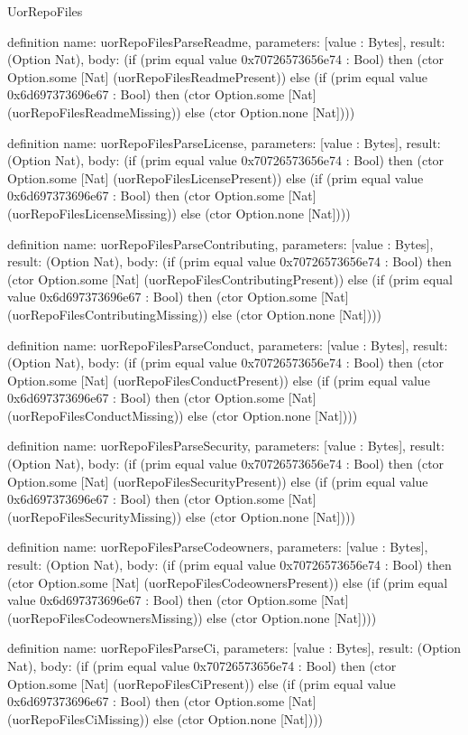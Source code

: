 \begin{lexlean}{UorRepoFiles}
\begin{semanticmodule}
definition{
  name: uorRepoFilesParseReadme,
  parameters: [value : Bytes],
  result: (Option Nat),
  body: (if (prim equal value 0x70726573656e74 : Bool) then (ctor Option.some [Nat] (uorRepoFilesReadmePresent)) else (if (prim equal value 0x6d697373696e67 : Bool) then (ctor Option.some [Nat] (uorRepoFilesReadmeMissing)) else (ctor Option.none [Nat])))
}

definition{
  name: uorRepoFilesParseLicense,
  parameters: [value : Bytes],
  result: (Option Nat),
  body: (if (prim equal value 0x70726573656e74 : Bool) then (ctor Option.some [Nat] (uorRepoFilesLicensePresent)) else (if (prim equal value 0x6d697373696e67 : Bool) then (ctor Option.some [Nat] (uorRepoFilesLicenseMissing)) else (ctor Option.none [Nat])))
}

definition{
  name: uorRepoFilesParseContributing,
  parameters: [value : Bytes],
  result: (Option Nat),
  body: (if (prim equal value 0x70726573656e74 : Bool) then (ctor Option.some [Nat] (uorRepoFilesContributingPresent)) else (if (prim equal value 0x6d697373696e67 : Bool) then (ctor Option.some [Nat] (uorRepoFilesContributingMissing)) else (ctor Option.none [Nat])))
}

definition{
  name: uorRepoFilesParseConduct,
  parameters: [value : Bytes],
  result: (Option Nat),
  body: (if (prim equal value 0x70726573656e74 : Bool) then (ctor Option.some [Nat] (uorRepoFilesConductPresent)) else (if (prim equal value 0x6d697373696e67 : Bool) then (ctor Option.some [Nat] (uorRepoFilesConductMissing)) else (ctor Option.none [Nat])))
}

definition{
  name: uorRepoFilesParseSecurity,
  parameters: [value : Bytes],
  result: (Option Nat),
  body: (if (prim equal value 0x70726573656e74 : Bool) then (ctor Option.some [Nat] (uorRepoFilesSecurityPresent)) else (if (prim equal value 0x6d697373696e67 : Bool) then (ctor Option.some [Nat] (uorRepoFilesSecurityMissing)) else (ctor Option.none [Nat])))
}

definition{
  name: uorRepoFilesParseCodeowners,
  parameters: [value : Bytes],
  result: (Option Nat),
  body: (if (prim equal value 0x70726573656e74 : Bool) then (ctor Option.some [Nat] (uorRepoFilesCodeownersPresent)) else (if (prim equal value 0x6d697373696e67 : Bool) then (ctor Option.some [Nat] (uorRepoFilesCodeownersMissing)) else (ctor Option.none [Nat])))
}

definition{
  name: uorRepoFilesParseCi,
  parameters: [value : Bytes],
  result: (Option Nat),
  body: (if (prim equal value 0x70726573656e74 : Bool) then (ctor Option.some [Nat] (uorRepoFilesCiPresent)) else (if (prim equal value 0x6d697373696e67 : Bool) then (ctor Option.some [Nat] (uorRepoFilesCiMissing)) else (ctor Option.none [Nat])))
}


\end{semanticmodule}
\end{lexlean}
